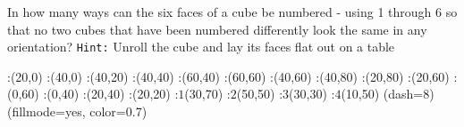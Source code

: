 
%
%
%
%
% 
% 


\question[6] In how many ways can the six faces of a cube be numbered - using 1 through 6 
so that no two cubes that have been numbered differently look the same in any orientation?
\texttt{Hint:} Unroll the cube and lay its faces flat out on a table


\ifprintanswers
  \begin{marginfigure}
      :(20,0)
      :(40,0)
      :(40,20)
      :(40,40)
      :(60,40)
      :(60,60)
      :(40,60)
      :(40,80)
      :(20,80) 
      :(20,60)
      :(0,60)
      :(0,40)
      :(20,40)
      :(20,20)
      :$1$(30,70)
      :$2$(50,50)
      :$3$(30,30)
      :$4$(10,50)
    \figdrawbegin{}
      \figdrawline[100,101,102,103,104,105,106,107,108,109,110,111,112,113,100]
      \figset (dash=8)
      \figdrawline[103,106,109,112,103]
      \figset (fillmode=yes, color=0.7)
      \figdrawline[100,101,102,113,100]
    \figdrawend
    \centerline{\box\figBoxA}
  \end{marginfigure}
  
